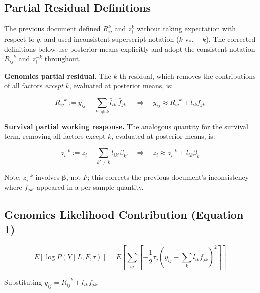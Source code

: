 \documentclass{article}[12pt]
\newcommand{\lbar}[2]{\bar{l}_{#1#2}}
\newcommand{\fbar}[2]{\bar{f}_{#1#2}}
\newcommand{\bbar}[1]{\bar{\beta}_{#1}}
\begin{document}
\subsection{Partial Residual Definitions}

\begin{correctionbox}[title={Item 1 \& 2 Fix: Posterior-Mean Residual Definitions}]
The previous document defined $R^{k}_{ij}$ and $z^{k}_{i}$ without taking
expectation with respect to $q$, and used inconsistent superscript notation
($k$ vs.\ $-k$). The corrected definitions below use posterior means explicitly
and adopt the consistent notation $R^{-k}_{ij}$ and $z^{-k}_{i}$ throughout.
\end{correctionbox}

\medskip
\noindent\textbf{Genomics partial residual.}  The $k$-th residual, which
removes the contributions of all factors \emph{except} $k$, evaluated at
posterior means, is:

\begin{equation}
    R^{-k}_{ij} := y_{ij} - \sum_{k'\neq k}\lbar{i}{k'}\fbar{j}{k'}
    \quad\Rightarrow\quad y_{ij} \approx R^{-k}_{ij} + l_{ik}f_{jk}
    \label{eq:Rk-def}
\end{equation}

\noindent\textbf{Survival partial working response.}  The analogous quantity
for the survival term, removing all factors except $k$, evaluated at posterior
means, is:

\begin{equation}
    z^{-k}_{i} := z_i - \sum_{k'\neq k}\lbar{i}{k'}\bbar{k'}
    \quad\Rightarrow\quad z_i \approx z^{-k}_{i} + l_{ik}\beta_k
    \label{eq:zk-def}
\end{equation}

Note: $z_i^{-k}$ involves $\bm{\beta}$, not $F$; this corrects the previous
document's inconsistency where $f_{jk'}$ appeared in a per-sample quantity.

\subsection{Genomics Likelihood Contribution (Equation 1)}

\begin{equation}
    E\!\left[\log P(Y \mid L, F, \tau)\right]
    = E\!\left[\sum_{ij}\left[-\frac{1}{2}\tau_j\left(y_{ij} - \sum_k l_{ik}f_{jk}\right)^2\right]\right]
\end{equation}

Substituting $y_{ij} = R^{-k}_{ij} + l_{ik}f_{jk}$:
\end{document}
